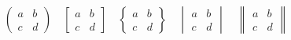 \[ \begin{pmatrix} a&b\\c&d \end{pmatrix} \quad
  \begin{bmatrix} a&b\\c&d \end{bmatrix} \quad
  \begin{Bmatrix} a&b\\c&d \end{Bmatrix} \quad
  \begin{vmatrix} a&b\\c&d \end{vmatrix} \quad
  \begin{Vmatrix} a&b\\c&d \end{Vmatrix} \]
